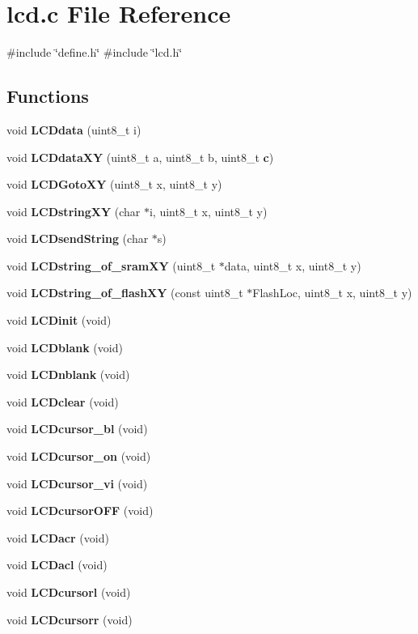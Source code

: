 \section{lcd.\+c File Reference}
\label{lcd_8c}
{\ttfamily \#include \char`\"{}define.\+h\char`\"{}}\newline
{\ttfamily \#include \char`\"{}lcd.\+h\char`\"{}}\newline
\subsection*{Functions}
\begin{DoxyCompactItemize}
\item 
void \textbf{ L\+C\+Ddata} (uint8\+\_\+t i)
\item 
void \textbf{ L\+C\+Ddata\+XY} (uint8\+\_\+t a, uint8\+\_\+t b, uint8\+\_\+t \textbf{ c})
\item 
void \textbf{ L\+C\+D\+Goto\+XY} (uint8\+\_\+t x, uint8\+\_\+t y)
\item 
void \textbf{ L\+C\+Dstring\+XY} (char $\ast$i, uint8\+\_\+t x, uint8\+\_\+t y)
\item 
void \textbf{ L\+C\+Dsend\+String} (char $\ast$s)
\item 
void \textbf{ L\+C\+Dstring\+\_\+of\+\_\+sram\+XY} (uint8\+\_\+t $\ast$data, uint8\+\_\+t x, uint8\+\_\+t y)
\item 
void \textbf{ L\+C\+Dstring\+\_\+of\+\_\+flash\+XY} (const uint8\+\_\+t $\ast$Flash\+Loc, uint8\+\_\+t x, uint8\+\_\+t y)
\item 
void \textbf{ L\+C\+Dinit} (void)
\item 
void \textbf{ L\+C\+Dblank} (void)
\item 
void \textbf{ L\+C\+Dnblank} (void)
\item 
void \textbf{ L\+C\+Dclear} (void)
\item 
void \textbf{ L\+C\+Dcursor\+\_\+bl} (void)
\item 
void \textbf{ L\+C\+Dcursor\+\_\+on} (void)
\item 
void \textbf{ L\+C\+Dcursor\+\_\+vi} (void)
\item 
void \textbf{ L\+C\+Dcursor\+O\+FF} (void)
\item 
void \textbf{ L\+C\+Dacr} (void)
\item 
void \textbf{ L\+C\+Dacl} (void)
\item 
void \textbf{ L\+C\+Dcursorl} (void)
\item 
void \textbf{ L\+C\+Dcursorr} (void)
\item 

\end{DoxyCompactItemize}
